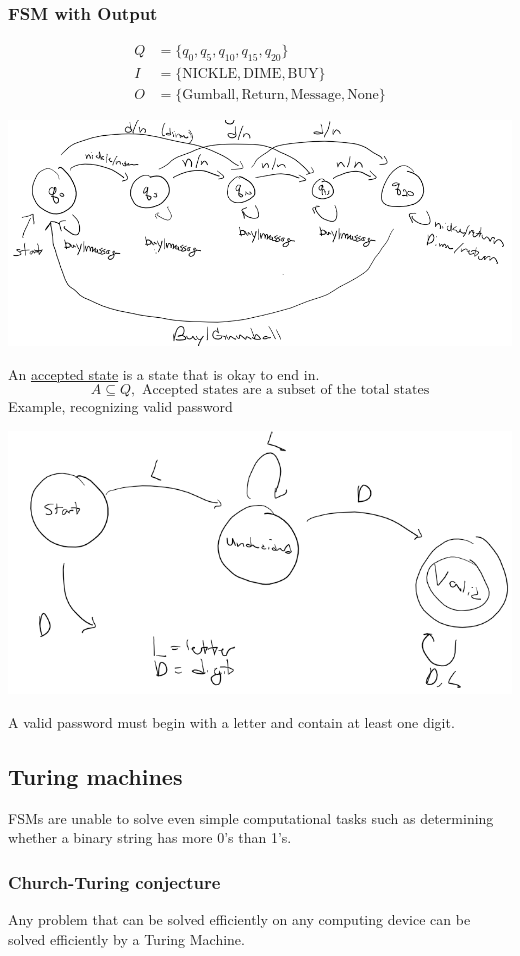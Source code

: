 \subsubsection*{FSM with Output}
\begin{align*}
  Q & = \{q_0, q_5, q_{10}, q_{15}, q_{20}\}                           \\
  I & = \{\text{NICKLE}, \text{DIME}, \text{BUY}\}                     \\
  O & = \{\text{Gumball}, \text{Return}, \text{Message}, \text{None}\}
\end{align*}
\begin{center}
  \includegraphics[width=.6\linewidth]{resources/fsm_with_output.png}
\end{center}
An \underline{accepted state} is a state that is okay to end in.
\[
  A \subseteq Q, \text{ Accepted states are a subset of the total states}
\]
Example, recognizing valid password
\begin{center}
  \includegraphics[width=.6\linewidth]{resources/fsm_password.png}

  A valid password must begin with a letter and contain at least one digit.
\end{center}

\subsection{Turing machines}
FSMs are unable to solve even simple computational tasks such as determining whether a binary string has more 0's than 1's.

\subsubsection*{Church-Turing conjecture}
Any problem that can be solved efficiently on any computing device can be solved efficiently by a Turing Machine.

